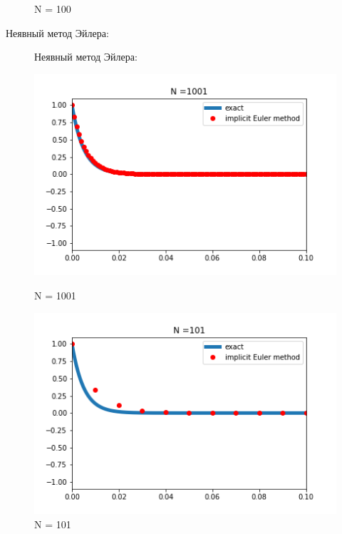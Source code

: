 \documentclass[11pt]{article}
\begin{document}
\begin{figure}[h]
\begin{center}
\begin{minipage}[h]{0.3\linewidth}
    \caption{N = 100}
    \label{p3}
    \end{minipage}
    \end{center}
\end{figure}
\begin{center}
    Неявный метод Эйлера:
\end{center}

\begin{figure}[h]
    \caption{Неявный метод Эйлера:}
    \begin{center}
    \begin{minipage}[h]{0.3\linewidth}
    \includegraphics[width=1\linewidth]{implicit_1001.png}
    \caption{N = 1001}
    \label{p2}
    \end{minipage}
    \hfill
    \begin{minipage}[h]{0.3\linewidth}
    \includegraphics[width=1\linewidth]{implicit_101.png}
    \caption{N = 101}

\end{minipage}
\end{center}
\end{figure}
\end{document}
